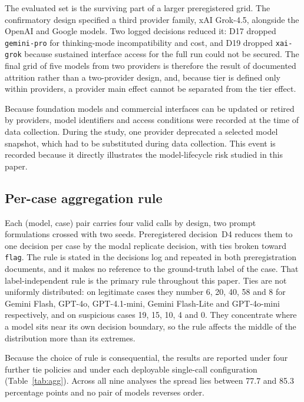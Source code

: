 \documentclass[pdflatex,sn-basic,Numbered]{sn-jnl}
\begin{document}
The evaluated set is the surviving part of a larger preregistered grid. The confirmatory design specified a third provider family, xAI Grok-4.5, alongside the OpenAI and Google models. Two logged decisions reduced it: D17 dropped \texttt{gemini-pro} for thinking-mode incompatibility and cost, and D19 dropped \texttt{xai-grok} because sustained interface access for the full run could not be secured. The final grid of five models from two providers is therefore the result of documented attrition rather than a two-provider design, and, because tier is defined only within providers, a provider main effect cannot be separated from the tier effect.

Because foundation models and commercial interfaces can be updated or retired by providers, model identifiers and access conditions were recorded at the time of data collection. During the study, one provider deprecated a selected model snapshot, which had to be substituted during data collection. This event is recorded because it directly illustrates the model-lifecycle risk studied in this paper.

\subsection{Per-case aggregation rule}\label{sec:agg}

Each (model, case) pair carries four valid calls by design, two prompt formulations crossed with two seeds. Preregistered decision~D4 reduces them to one decision per case by the modal replicate decision, with ties broken toward \texttt{flag}. The rule is stated in the decisions log and repeated in both preregistration documents, and it makes no reference to the ground-truth label of the case. That label-independent rule is the primary rule throughout this paper. Ties are not uniformly distributed: on legitimate cases they number 6, 20, 40, 58 and 8 for Gemini Flash, GPT-4o, GPT-4.1-mini, Gemini Flash-Lite and GPT-4o-mini respectively, and on suspicious cases 19, 15, 10, 4 and 0. They concentrate where a model sits near its own decision boundary, so the rule affects the middle of the distribution more than its extremes.

Because the choice of rule is consequential, the results are reported under four further tie policies and under each deployable single-call configuration (Table~\ref{tab:agg}). Across all nine analyses the spread lies between 77.7 and 85.3 percentage points and no pair of models reverses order.
\end{document}
